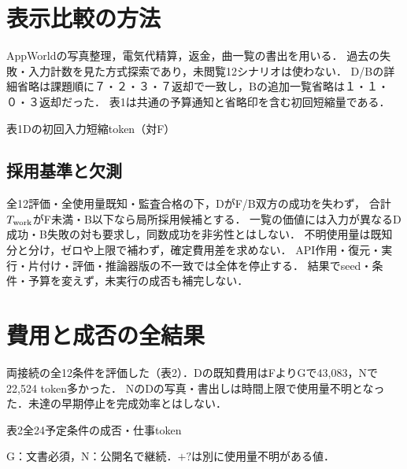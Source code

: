 \documentclass[letter]{ieicej}
\begin{document}
\section{表示比較の方法}



AppWorld\cite{appworld}の写真整理，電気代精算，返金，曲一覧の書出を用いる．
過去の失敗・入力計数を見た方式探索であり，未閲覧12シナリオは使わない．
D/Bの詳細省略は課題順に７・２・３・７返却で一致し，Bの追加一覧省略は１・１・０・３返却だった．
表1は共通の予算通知と省略印を含む初回短縮量である．

\begin{center}\begin{minipage}{\columnwidth}\centering
\small 表1\quad Dの初回入力短縮token（対F）\par\smallskip
\PublicDisplayInitialSavings
\end{minipage}\end{center}

\subsection{採用基準と欠測}
全12評価・全使用量既知・監査合格の下，DがF/B双方の成功を失わず，
合計$T_{\rm work}$がF未満・B以下なら局所採用候補とする．
一覧の価値には入力が異なるD成功・B失敗の対も要求し，同数成功を非劣性とはしない．
不明使用量は既知分と分け，ゼロや上限で補わず，確定費用差を求めない．
API作用・復元・実行・片付け・評価・推論器版の不一致では全体を停止する．
結果でseed・条件・予算を変えず，未実行の成否も補完しない．

\section{費用と成否の全結果}
両接続の全12条件を評価した（表2）．Dの既知費用はFよりGで43,083，Nで22,524 token多かった．
NのDの写真・書出しは時間上限で使用量不明となった．未達の早期停止を完成効率とはしない．

\begin{center}\begin{minipage}{\columnwidth}\centering
\small 表2\quad 全24予定条件の成否・仕事token\par\smallskip
\PublicDisplayAllCells
\par\smallskip\footnotesize G：文書必須，N：公開名で継続．$+?$は別に使用量不明がある値．
\end{minipage}\end{center}
\end{document}
